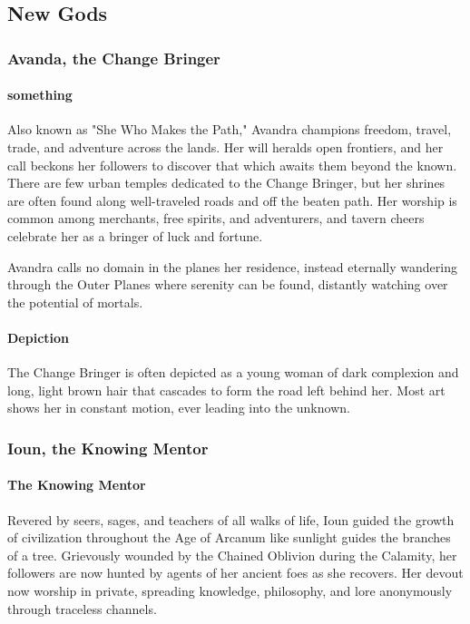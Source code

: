 \documentclass[letterpaper,twocolumn,openany,nodeprecatedcode]{dndbook}
\begin{document}
\subsection{New Gods}

\subsubsection{Avanda, the Change Bringer}

\paragraph{something}
Also known as "She Who Makes the Path," Avandra champions freedom, travel, trade, and
adventure across the lands. Her will heralds open frontiers, and her call beckons her
followers to discover that which awaits them beyond the known. There are few urban temples
dedicated to the Change Bringer, but her shrines are often found along well-traveled roads
and off the beaten path. Her worship is common among merchants, free spirits, and adventurers,
and tavern cheers celebrate her as a bringer of luck and fortune.

Avandra calls no domain in the planes her residence, instead eternally wandering through the
Outer Planes where serenity can be found, distantly watching over the potential of mortals.

\paragraph{Depiction}
The Change Bringer is often depicted as a young woman of dark complexion and long, light brown
hair that cascades to form the road left behind her. Most art shows her in constant motion,
ever leading into the unknown.

\subsubsection{Ioun, the Knowing Mentor}

\paragraph{The Knowing Mentor}
Revered by seers, sages, and teachers of all walks of life, Ioun guided the growth of
civilization throughout the Age of Arcanum like sunlight guides the branches of a tree.
Grievously wounded by the Chained Oblivion during the Calamity, her followers are now
hunted by agents of her ancient foes as she recovers. Her devout now worship in private,
spreading knowledge, philosophy, and lore anonymously through traceless channels.
\end{document}
